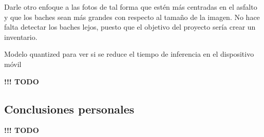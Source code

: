 Darle otro enfoque a las fotos de tal forma que estén más centradas en el asfalto y que los baches sean más grandes con respecto al tamaño de la imagen. No hace falta detectar los baches lejos, puesto que el objetivo del proyecto sería crear un inventario.

Modelo quantized para ver si se reduce el tiempo de inferencia en el dispositivo móvil

{\color{red} \textbf{!!! TODO}}

\subsection{Conclusiones personales}

{\color{red} \textbf{!!! TODO}}
